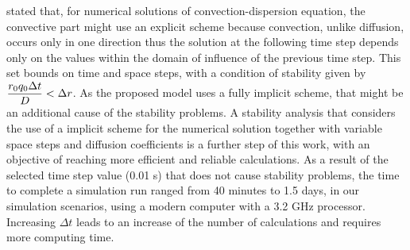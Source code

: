 \citeonline[roose2009] stated that, for numerical solutions of convection-dispersion equation, the convective part might use an explicit scheme because convection, unlike diffusion, occurs only in one direction thus the solution at the following time step depends only on the values within the domain of influence of the previous time step. 
This set bounds on time and space steps, with a condition of stability given by $\displaystyle{r_0 q_0 \Delta t \over D} < \Delta r$. 
{\tblue As the proposed model uses a fully implicit scheme, that might be an additional cause of the stability problems. 
A stability analysis that considers the use of a implicit scheme for the numerical solution together with variable space steps and diffusion coefficients is a further step of this work, with an objective of reaching more efficient and reliable calculations.
}
{\tblue As a result of the selected time step value (0.01 s) that does not cause stability problems, the time to complete a simulation run ranged from 40 minutes to 1.5 days, in our simulation scenarios, using a modern computer with a 3.2 GHz processor.
Increasing $\Delta t$ leads to an increase of the number of calculations and requires more computing time.
}




